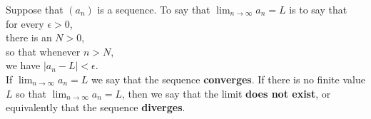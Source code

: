 \documentclass{ximera}
\newcommand{\defnword}[1]{\textbf{#1}}
\newcommand{\ds}{\displaystyle}
\renewcommand{\index}[1]{}
\begin{document}
\begin{definition} \relax\index{limit of a sequence}
\label{definition:limit-of-a-sequence}
Suppose that $\left(a_n\right)$ is a sequence.
To say that $\ds \lim_{n\to \infty}a_n=L$ is to say that \\
\null\quad for every $\epsilon>0$, \\
\null\quad\quad there is an $N > 0$, \\
\null\quad so that whenever $n>N$, \\
\null\quad\quad we have $|a_n-L|<\epsilon$. \\
If $\ds \lim_{n\to\infty}a_n=L$ we say that the sequence
\defnword{converges}\index{convergent
  sequence}\index{sequence!convergent}.  If there is no finite value $L$ so
that $\ds \lim_{n\to\infty}a_n = L$, then we say that the limit
\defnword{does not exist}, or equivalently that the sequence
\defnword{diverges}\index{divergent sequence}\index{sequence!divergent}.
\end{definition} 
\end{document}
